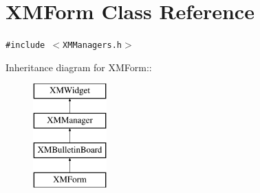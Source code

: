 \section{XMForm  Class Reference}
\label{classXMForm}
{\tt \#include $<$XMManagers.h$>$}

Inheritance diagram for XMForm::\begin{figure}[H]
\begin{center}
\leavevmode
\includegraphics[height=4cm]{classXMForm}
\end{center}
\end{figure}
